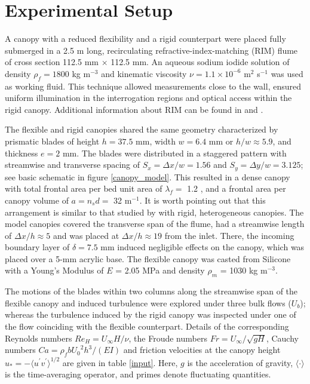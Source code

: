 \documentclass[lineno,authoryear]{FLO_v1}%
\theoremstyle{definition}
\begin{document}
\section{Experimental Setup}\label{sec:rules_submission}

A canopy with a reduced flexibility and a rigid counterpart were placed fully submerged in a 2.5 m long,
  recirculating refractive-index-matching (RIM) flume of cross section 112.5 mm $\times$ 112.5 mm.  
  An aqueous sodium iodide solution of density $\rho_f = 1800$ kg m$^{-3}$ and kinematic 
  viscosity $\nu = 1.1 \times 10^{-6}$ m$^2$ s$^{-1}$ was used as working fluid. This technique 
  allowed measurements close to the wall, ensured uniform illumination in the interrogation regions 
  and optical access within the rigid canopy. Additional  information about RIM can be found 
  in \citet{blois2012versatile,bai2014refractive} and \citet{hamed2017impact}.


The flexible and rigid canopies shared the same geometry characterized by prismatic blades of 
height  $h=37.5$ mm, width $w=6.4$ mm or $h/w\approx 5.9$, and thickness $e=2$ mm. The blades were 
distributed in a staggered pattern with streamwise and transverse spacing 
of $S_x=\Delta x/w=1.56$ and $S_y= \Delta y/w=3.125$; see basic schematic in figure \ref{canopy_model}. 
This resulted in a dense canopy with total frontal area per bed unit area of $\lambda_f = $ 
1.2 \citep{finnigan2000turbulence}, and a frontal area per canopy volume of $a = n_sd =$ 32 m$^{-1}$. 
It is worth pointing out that this arrangement is similar to that studied by \citet{hamed2017impact} 
with rigid, heterogeneous canopies. The model canopies covered the transverse span of the flume, had 
a streamwise length of $\Delta x/h\approx 5$ and was placed at $\Delta x/h\approx 19$ from the inlet. 
There, the incoming boundary layer of $\delta=7.5$ mm induced  negligible effects on the canopy, which 
was placed over a 5-mm acrylic base. The flexible canopy was casted from Silicone with a Young's Modulus 
of $E$ = 2.05 MPa and density $\rho_m$ = 1030 kg m$^{-3}$.

The motions of the blades within two columns along the streamwise span of the flexible canopy 
and induced turbulence were explored under three bulk flows ($U_b$); whereas the turbulence induced 
by the rigid canopy was inspected under one of the flow coinciding with the flexible counterpart. 
Details of the corresponding Reynolds numbers $Re_H = U_{\infty}H/\nu$, the Froude 
numbers $Fr = U_{\infty}/\sqrt{gH}$, Cauchy numbers $Ca = \rho_f b {U_0}^2 h^3/(EI)$ 
\citep{luhar2016wave} and friction velocities at the canopy 
height $u_* = -\langle u^\prime v^\prime\rangle ^{1/2}$ 
\citep{poggi2004effect, nezu2008turburence, chen2013flow} are given in 
table \ref{input}. Here, $g$ is the acceleration of gravity, $\langle \cdot \rangle$ is 
the time-averaging operator, and primes denote fluctuating quantities.
\end{document}
